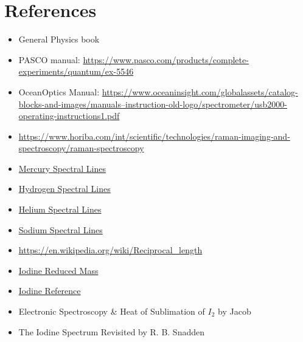 \documentclass[12pt]{article}
\begin{document}
	\section{References}
	\begin{itemize}
		\item General Physics book
		\item PASCO manual: \href{https://www.pasco.com/products/complete-experiments/quantum/ex-5546}{https://www.pasco.com/products/complete-experiments/quantum/ex-5546}
		\item OceanOptics Manual: \href{https://www.oceaninsight.com/globalassets/catalog-blocks-and-images/manuals--instruction-old-logo/spectrometer/usb2000-operating-instructions1.pdf}{https://www.oceaninsight.com/globalassets/catalog-blocks-and-images/manuals--instruction-old-logo/spectrometer/usb2000-operating-instructions1.pdf}
		\item \href{https://www.horiba.com/int/scientific/technologies/raman-imaging-and-spectroscopy/raman-spectroscopy}{https://www.horiba.com/int/scientific/technologies/raman-imaging-and-spectroscopy/raman-spectroscopy}
		\item \href{https://physics.nist.gov/PhysRefData/Handbook/Tables/mercurytable2.htm}{Mercury Spectral Lines}
		\item \href{https://physics.nist.gov/PhysRefData/Handbook/Tables/hydrogentable2.htm}{Hydrogen Spectral Lines}
		\item \href{https://physics.nist.gov/PhysRefData/Handbook/Tables/heliumtable2.htm}{Helium Spectral Lines}
		\item \href{https://physics.nist.gov/PhysRefData/Handbook/Tables/sodiumtable2.htm}{Sodium Spectral Lines}
		\item \href{https://en.wikipedia.org/wiki/Reciprocal_length}{https://en.wikipedia.org/wiki/Reciprocal\_length}
		\item \href{https://arxiv.org/pdf/1507.02600.pdf}{Iodine Reduced Mass}
		\item \href{https://faculty.uca.edu/kdooley/i2_spectrum_mcnaught.pdf}{Iodine Reference}
		\item Electronic Spectroscopy \& Heat of Sublimation of $I_2$ by Jacob
		\item The Iodine Spectrum Revisited by R. B. Snadden
	\end{itemize}
		
	
	
\end{document}
